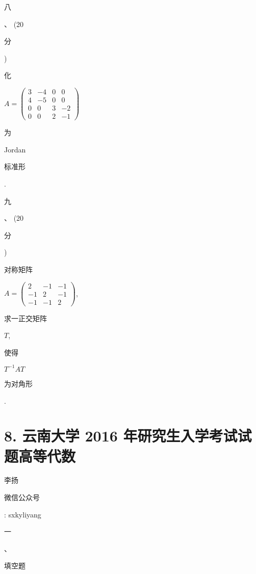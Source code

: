 \documentclass[10pt]{article}
\begin{document}
\begin{CJK}{UTF8}{mj}八\end{CJK}、 (20 \begin{CJK}{UTF8}{mj}分\end{CJK}) \begin{CJK}{UTF8}{mj}化\end{CJK} $A=\left(\begin{array}{cccc}3 & -4 & 0 & 0 \\ 4 & -5 & 0 & 0 \\ 0 & 0 & 3 & -2 \\ 0 & 0 & 2 & -1\end{array}\right)$ \begin{CJK}{UTF8}{mj}为\end{CJK} Jordan \begin{CJK}{UTF8}{mj}标准形\end{CJK}.

\begin{CJK}{UTF8}{mj}九\end{CJK}、 (20 \begin{CJK}{UTF8}{mj}分\end{CJK}) \begin{CJK}{UTF8}{mj}对称矩阵\end{CJK} $A=\left(\begin{array}{ccc}2 & -1 & -1 \\ -1 & 2 & -1 \\ -1 & -1 & 2\end{array}\right)$, \begin{CJK}{UTF8}{mj}求一正交矩阵\end{CJK} $T$, \begin{CJK}{UTF8}{mj}使得\end{CJK} $T^{-1} A T$ \begin{CJK}{UTF8}{mj}为对角形\end{CJK}.

\section{8. 云南大学 2016 年研究生入学考试试题高等代数}
\begin{CJK}{UTF8}{mj}李扬\end{CJK}

\begin{CJK}{UTF8}{mj}微信公众号\end{CJK}: sxkyliyang

\begin{CJK}{UTF8}{mj}一\end{CJK}、\begin{CJK}{UTF8}{mj}填空题\end{CJK}
\end{document}
